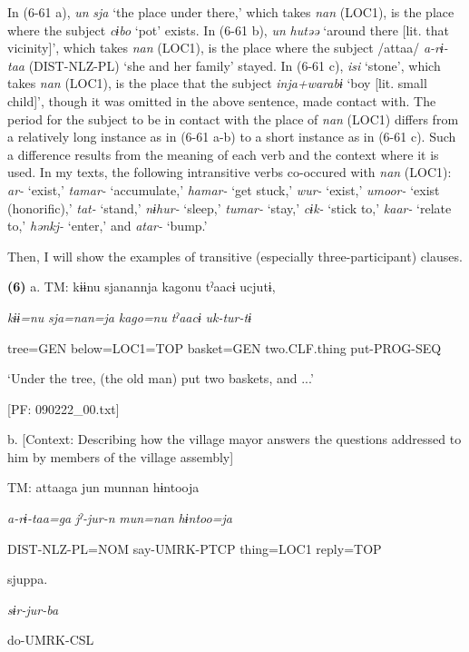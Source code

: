 In (6-61 a), \textit{un} \textit{sja} ‘the place under there,’ which takes \textit{nan} (LOC1), is the place where the subject \textit{cɨbo} ‘pot’ exists. In (6-61 b), \textit{un} \textit{hutəə} ‘around there [lit. that vicinity]’, which takes \textit{nan} (LOC1), is the place where the subject /attaa/ \textit{a-rɨ-taa} (DIST-NLZ-PL) ‘she and her family’ stayed. In (6-61 c), \textit{isi} ‘stone’, which takes \textit{nan} (LOC1), is the place that the subject \textit{inja+warabɨ} ‘boy [lit. small child]’, though it was omitted in the above sentence, made contact with. The period for the subject to be in contact with the place of \textit{nan} (LOC1) differs from a relatively long instance as in (6-61 a-b) to a short instance as in (6-61 c). Such a difference results from the meaning of each verb and the context where it is used. In my texts, the following intransitive verbs co-occured with \textit{nan} (LOC1): \textit{ar-} ‘exist,’ \textit{tamar-} ‘accumulate,’ \textit{hamar-} ‘get stuck,’ \textit{wur-} ‘exist,’ \textit{umoor-} ‘exist (honorific),’ \textit{tat-} ‘stand,’ \textit{nɨhur-} ‘sleep,’ \textit{tumar-} ‘stay,’ \textit{cɨk-} ‘stick to,’ \textit{kaar-} ‘relate to,’ \textit{hənkj-} ‘enter,’ and \textit{atar-} ‘bump.’

Then, I will show the examples of transitive (especially three-participant) clauses.

\textbf{(6)}  a.  TM:  kɨɨnu  sjanannja  kagonu  tˀaacɨ  ucjutɨ,

      \textit{kɨɨ=nu}  \textit{sja=nan=ja}  \textit{kago=nu}  \textit{tˀaacɨ}  \textit{uk-tur-tɨ}

      tree=GEN  below=LOC1=TOP  basket=GEN  two.CLF.thing  put-PROG-SEQ

      ‘Under the tree, (the old man) put two baskets, and ...’

      [PF: 090222\_00.txt]

  b.  [Context: Describing how the village mayor answers the questions addressed to him by  members of the village assembly]

    TM:  attaaga  jun  munnan  hɨntooja

      \textit{a-rɨ-taa=ga}  \textit{jˀ-jur-n}  \textit{mun=nan}  \textit{hɨntoo=ja}

      DIST-NLZ-PL=NOM  say-UMRK-PTCP  thing=LOC1  reply=TOP

      sjuppa.

      \textit{sɨr-jur-ba}

      do-UMRK-CSL

